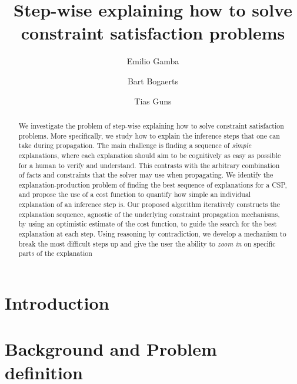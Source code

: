 \documentclass{llncs}
\begin{document}
%
\title{Step-wise explaining how to solve constraint satisfaction problems}
%
%
\author{Emilio Gamba \and
Bart Bogaerts \and
Tias Guns}

%
\maketitle

\begin{abstract}
We investigate the problem of step-wise explaining how to solve constraint satisfaction problems.
More specifically, we study how to explain the inference steps that one can take during propagation.
The main challenge is finding a sequence of \textit{simple} explanations, where each explanation should aim to be cognitively as easy as possible for a human to verify and understand.
This contrasts with the arbitrary combination of facts and constraints that the solver may use  when propagating.
We identify the explanation-production problem of finding the best sequence of explanations for a CSP, and propose the use of a cost function to quantify how simple an individual explanation of an inference step is.
Our proposed algorithm iteratively constructs the explanation sequence, agnostic of the underlying constraint propagation mechanisms, by using an optimistic estimate of the cost function, to guide the search for the best explanation at each step.
Using reasoning by contradiction, we develop a mechanism to break the most difficult steps up and give the user the ability to \emph{zoom in} on specific parts of the explanation
\end{abstract}
%
%
\section{Introduction}\label{sec:intro}

\section{Background and Problem definition}\label{sec:background}

\end{document}
